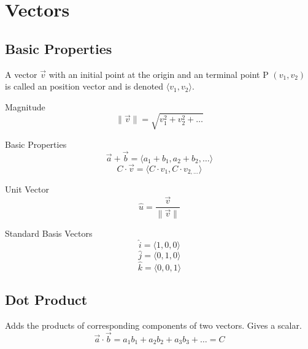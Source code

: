 \documentclass[12pt]{article}
\numberwithin{equation}{subsection}
\newcommand{\vecp}[1]{\langle #1 \rangle}
\newcommand{\magp}[1]{\| #1 \|}
\begin{document}
\newpage

\section{Vectors}
\subsection{Basic Properties}
\begin{flushleft}
A vector $\vec{v}$ with an initial point at the origin and an terminal point P $(v_{1},v_{2})$ is called an position vector and is denoted $\vecp{v_{1},v_{2}}$.\\
\bigskip

Magnitude
\begin{equation}
\magp{\vec{v}}=\sqrt{v_{1}^{2}+v_{2}^{2} + \dots}
\end{equation}

Basic Properties
\begin{equation}
\vec{a}+\vec{b}= \vecp{a_{1}+b_{1}, a_{2}+b_{2}, \dots}
\end{equation}
\begin{equation}
C \cdot \vec{v} = \vecp{C \cdot v_{1}, C \cdot v_{2, \dots}}
\end{equation}

Unit Vector
\begin{equation}
\hat{u}=\frac{\vec{v}}{\magp{\vec{v}}}
\end{equation}

Standard Basis Vectors
\begin{equation}
\hat{i}=\vecp{1, 0, 0}
\end{equation}
\begin{equation}
\hat{j}=\vecp{0, 1, 0}
\end{equation}
\begin{equation}
\hat{k}=\vecp{0, 0, 1}
\end{equation}


\subsection{Dot Product}
Adds the products of corresponding components of two vectors. Gives a scalar.
\begin{equation}
\vec{a} \cdot \vec{b}= a_{1}b_{1}+a_{2}b_{2}+a_{3}b_{3}+\dots= C
\end{equation} 


\end{flushleft}
\end{document}
